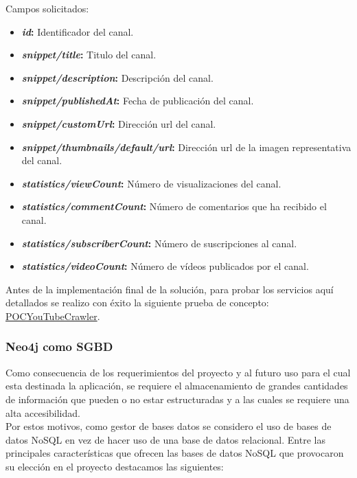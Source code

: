 \documentclass[11pt,a4paper]{article}
\begin{document}
Campos solicitados:
\begin{itemize}
\item \textbf{\textit{id}:} Identificador del canal.
\item \textbf{\textit{snippet/title}:} Titulo del canal.
\item \textbf{\textit{snippet/description}:} Descripción del canal.
\item \textbf{\textit{snippet/publishedAt}:} Fecha de publicación del canal.
\item \textbf{\textit{snippet/customUrl}:} Dirección url del canal.
\item \textbf{\textit{snippet/thumbnails/default/url}:} Dirección url de la imagen representativa del canal.
\item \textbf{\textit{statistics/viewCount}:} Número de visualizaciones del canal.
\item \textbf{\textit{statistics/commentCount}:} Número de comentarios que ha recibido el canal.
\item \textbf{\textit{statistics/subscriberCount}:} Número de suscripciones al canal.
\item \textbf{\textit{statistics/videoCount}:} Número de vídeos publicados por el canal.
\end{itemize}

Antes de la implementación final de la solución, para probar los servicios aquí detallados se realizo con éxito la siguiente prueba de concepto: \href{https://github.com/jsanchezmend/TFGAntivacunas/tree/master/POCYouTubeCrawler}{POCYouTubeCrawler}.

\medskip 

\subsubsection{Neo4j como SGBD}\label{sgbd} 
Como consecuencia de los requerimientos del proyecto y al futuro uso para el cual esta destinada la aplicación, se requiere el almacenamiento de grandes cantidades de información que pueden o no estar estructuradas y a las cuales se requiere una alta accesibilidad.
\\

Por estos motivos, como gestor de bases datos se considero el uso de bases de datos NoSQL en vez de hacer uso de una base de datos relacional. Entre las principales características que ofrecen las bases de datos NoSQL que provocaron su elección en el proyecto destacamos las siguientes:
\end{document}
